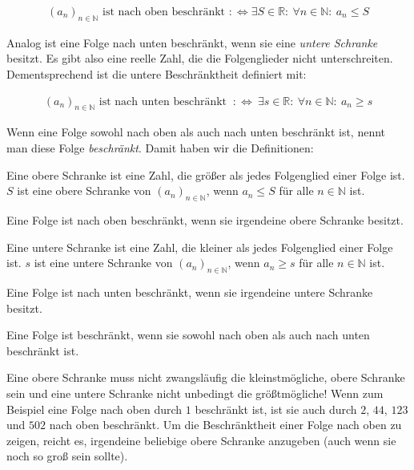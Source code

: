 \documentclass[fontsize=9pt,
               parskip=half-,
               DIV=14,
               listof=chapterentry,
               tocflat]{scrbook}
\begin{document}
\begin{align*}
\left(a_{n}\right)_{n\in \mathbb {N} }{\text{ ist nach oben beschränkt }}:\iff \exists S\in \mathbb {R} :\ \forall n\in \mathbb {N} :\ a_{n}\leq S
\end{align*}

Analog ist eine Folge nach unten beschränkt, wenn sie eine \emph{untere Schranke} besitzt. Es gibt also eine reelle Zahl, die die Folgenglieder nicht unterschreiten. Dementsprechend ist die untere Beschränktheit definiert mit:

\begin{align*}
\left(a_{n}\right)_{n\in \mathbb {N} }{\text{ ist nach unten beschränkt }}\ :\iff \ \exists s\in \mathbb {R} :\ \forall n\in \mathbb {N} :\ a_{n}\geq s
\end{align*}

Wenn eine Folge sowohl nach oben als auch nach unten beschränkt ist, nennt man diese Folge \emph{beschränkt}. Damit haben wir die Definitionen:

\begin{description}[style=nextline]
\item[obere Schranke]
Eine obere Schranke ist eine Zahl, die größer als jedes Folgenglied einer Folge ist. $S$ ist eine obere Schranke von $(a_{n})_{n\in \mathbb {N} }$, wenn $a_{n}\leq S$ für alle $n\in \mathbb {N} $ ist.\item[nach oben beschränkte Folge]
Eine Folge ist nach oben beschränkt, wenn sie irgendeine obere Schranke besitzt.\item[untere Schranke]
Eine untere Schranke ist eine Zahl, die kleiner als jedes Folgenglied einer Folge ist. $s$ ist eine untere Schranke von $(a_{n})_{n\in \mathbb {N} }$, wenn $a_{n}\geq s$ für alle $n\in \mathbb {N} $ ist.\item[nach unten beschränkte Folge]
Eine Folge ist nach unten beschränkt, wenn sie irgendeine untere Schranke besitzt.\item[beschränkte Folge]
Eine Folge ist beschränkt, wenn sie sowohl nach oben als auch nach unten beschränkt ist.\end{description}

\begin{hint*}
Eine obere Schranke muss nicht zwangsläufig die kleinstmögliche, obere Schranke sein und eine untere Schranke nicht unbedingt die größtmögliche! Wenn zum Beispiel eine Folge nach oben durch $1$ beschränkt ist, ist sie auch durch $2$, $44$, $123$ und $502$ nach oben beschränkt. Um die Beschränktheit einer Folge nach oben zu zeigen, reicht es, irgendeine beliebige obere Schranke anzugeben (auch wenn sie noch so groß sein sollte).

\end{hint*}
\end{document}
